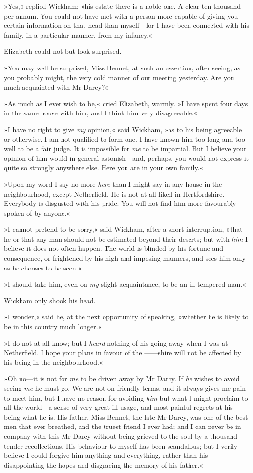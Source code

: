 »Yes,« replied Wickham; »his estate there is a noble one. A clear ten thousand per annum. You could not have met with a person more capable of giving you certain information on that head than myself—for I have been connected with his family, in a particular manner, from my infancy.«

Elizabeth could not but look surprised.

»You may well be surprised, Miss Bennet, at such an assertion, after seeing, as you probably might, the very cold manner of our meeting yesterday. Are you much acquainted with Mr Darcy?«

»As much as I ever wish to be,« cried Elizabeth, warmly. »I have spent four days in the same house with him, and I think him very disagreeable.«

»I have no right to give \textit{my} opinion,« said Wickham, »as to his being agreeable or otherwise. I am not qualified to form one. I have known him too long and too well to be a fair judge. It is impossible for \textit{me} to be impartial. But I believe your opinion of him would in general astonish—and, perhaps, you would not express it quite so strongly anywhere else. Here you are in your own family.«

»Upon my word I say no more \textit{here} than I might say in any house in the neighbourhood, except Netherfield. He is not at all liked in Hertfordshire. Everybody is disgusted with his pride. You will not find him more favourably spoken of by anyone.«

»I cannot pretend to be sorry,« said Wickham, after a short interruption, »that he or that any man should not be estimated beyond their deserts; but with \textit{him} I believe it does not often happen. The world is blinded by his fortune and consequence, or frightened by his high and imposing manners, and sees him only as he chooses to be seen.«

»I should take him, even on \textit{my} slight acquaintance, to be an ill-tempered man.«

Wickham only shook his head.

»I wonder,« said he, at the next opportunity of speaking, »whether he is likely to be in this country much longer.«

»I do not at all know; but I \textit{heard} nothing of his going away when I was at Netherfield. I hope your plans in favour of the ——shire will not be affected by his being in the neighbourhood.«

»Oh no—it is not for \textit{me} to be driven away by Mr Darcy. If \textit{he} wishes to avoid seeing \textit{me} he must go. We are not on friendly terms, and it always gives me pain to meet him, but I have no reason for avoiding \textit{him} but what I might proclaim to all the world—a sense of very great ill-usage, and most painful regrets at his being what he is. His father, Miss Bennet, the late Mr Darcy, was one of the best men that ever breathed, and the truest friend I ever had; and I can never be in company with this Mr Darcy without being grieved to the soul by a thousand tender recollections. His behaviour to myself has been scandalous; but I verily believe I could forgive him anything and everything, rather than his disappointing the hopes and disgracing the memory of his father.«

